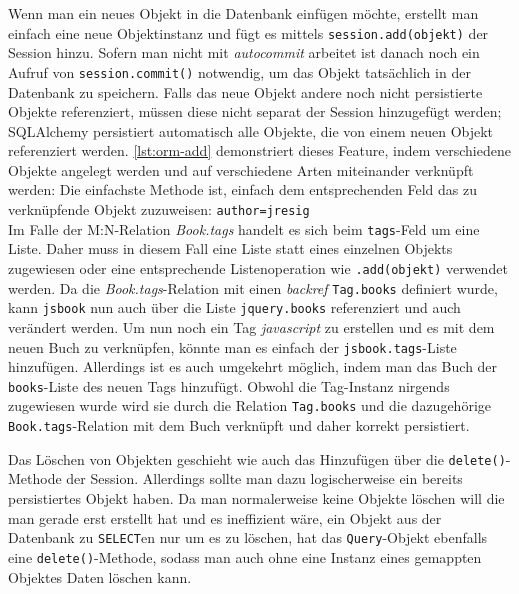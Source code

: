 Wenn man ein neues Objekt in die Datenbank einfügen möchte, erstellt man einfach
eine neue Objektinstanz und fügt es mittels \texttt{session.add(objekt)} der
Session hinzu. Sofern man nicht mit \emph{autocommit} arbeitet ist danach noch
ein Aufruf von \texttt{session.commit()} notwendig, um das Objekt tatsächlich in
der Datenbank zu speichern. Falls das neue Objekt andere noch nicht persistierte
Objekte referenziert, müssen diese nicht separat der Session hinzugefügt werden;
SQLAlchemy persistiert automatisch alle Objekte, die von einem neuen Objekt
referenziert werden. \autoref{lst:orm-add} demonstriert dieses Feature, indem
verschiedene Objekte angelegt werden und auf verschiedene Arten miteinander
verknüpft werden:
Die einfachste Methode ist, einfach dem entsprechenden Feld das zu verknüpfende
Objekt zuzuweisen: \texttt{author=jresig} \\
Im Falle der M:N-Relation \emph{Book.tags} handelt es sich beim
\texttt{tags}-Feld um eine Liste. Daher muss in diesem Fall eine Liste statt
eines einzelnen Objekts zugewiesen oder eine entsprechende Listenoperation
wie \texttt{.add(objekt)} verwendet werden. Da die \emph{Book.tags}-Relation
mit einen \textit{backref} \texttt{Tag.books} definiert wurde, kann
\texttt{jsbook} nun auch über die Liste \texttt{jquery.books} referenziert und
auch verändert werden. Um nun noch ein Tag \emph{javascript} zu erstellen und es
mit dem neuen Buch zu verknüpfen, könnte man es einfach der
\texttt{jsbook.tags}-Liste hinzufügen. Allerdings ist es auch umgekehrt möglich,
indem man das Buch der \texttt{books}-Liste des neuen Tags hinzufügt. Obwohl die
Tag-Instanz nirgends zugewiesen wurde wird sie durch die Relation
\texttt{Tag.books} und die dazugehörige \texttt{Book.tags}-Relation mit dem Buch
verknüpft und daher korrekt persistiert.



Das Löschen von Objekten geschieht wie auch das Hinzufügen über die
\texttt{delete()}-Methode der Session. Allerdings sollte man dazu logischerweise ein
bereits persistiertes Objekt haben. Da man normalerweise keine Objekte löschen
will die man gerade erst erstellt hat und es ineffizient wäre, ein Objekt aus
der Datenbank zu \texttt{SELECT}en nur um es zu löschen, hat das
\texttt{Query}-Objekt ebenfalls eine \texttt{delete()}-Methode, sodass man auch
ohne eine Instanz eines gemappten Objektes Daten löschen kann.

